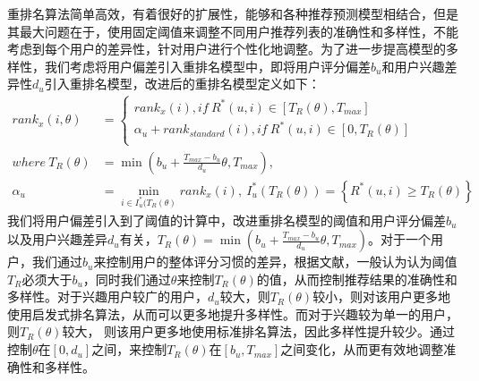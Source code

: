 \documentclass[master,winfonts]{njuthesis}
\begin{document}
重排名算法简单高效，有着很好的扩展性，能够和各种推荐预测模型相结合，但是其最大问题在于，使用固定阈值来调整不同用户推荐列表的准确性和多样性，不能考虑到每个用户的差异性，针对用户进行个性化地调整。为了进一步提高模型的多样性，我们考虑将用户偏差引入重排名模型中，即将用户评分偏差$b_u$和用户兴趣差异性$d_u$引入重排名模型，改进后的重排名模型定义如下：
\begin{equation}
\begin{aligned}
rank_x(i,\theta) &= \left\{  
             \begin{array}{lr}  
            rank_x(i) ,if \ R^*(u,i)\in \left [ T_R(\theta),T_{max} \right ] &\\  
             \alpha_u+rank_{standard}(i),if \ R^*(u,i) \in \left [0,T_R(\theta) \right ]&\\  
      
             \end{array}  
\right.\\
where \ T_R(\theta) &= \min (b_u+\frac{T_{max}-b_u}{d_u}\theta,T_{max}), \\
\alpha_u &= \min \limits_{i \in I^*_u(T_R(\theta)}rank_x(i),\ I^*_u(T_R(\theta)) =\left \{R^*(u,i)\geq T_R(\theta)  \right \}
\end{aligned}
\end{equation}
我们将用户偏差引入到了阈值的计算中，改进重排名模型的阈值和用户评分偏差$b_u$以及用户兴趣差异$d_u$有关，$T_R(\theta) = \min (b_u+\frac{T_{max}-b_u}{d_u}\theta,T_{max})$。对于一个用户，我们通过$b_u$来控制用户的整体评分习惯的差异，根据文献\cite{钟足峰2017可提高多样性的基于重排序图书推荐算法研究,彭飞2012加入用户评分偏置的推荐系统排名模型}，一般认为认为阈值$T_R$必须大于$b_u$，同时我们通过$\theta$来控制$T_R(\theta)$的值，从而控制推荐结果的准确性和多样性。对于兴趣用户较广的用户，$d_u$较大，则$T_R(\theta)$较小，则对该用户更多地使用启发式排名算法，从而可以更多地提升多样性。而对于兴趣较为单一的用户，则$T_R(\theta)$较大， 则该用户更多地使用标准排名算法，因此多样性提升较少。通过控制$\theta$在$\left[0,d_u\right]$之间，来控制$T_R(\theta)$在$\left[b_u,T_{max}\right]$之间变化，从而更有效地调整准确性和多样性。
\end{document}
